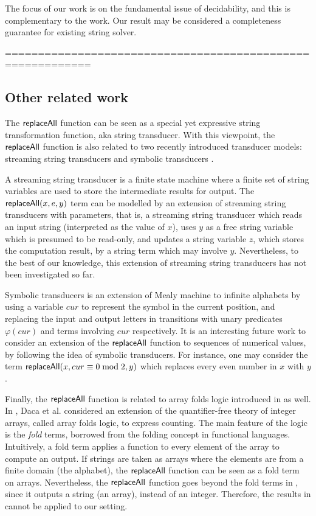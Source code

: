 The focus of our work is on the fundamental issue of decidability, and this is complementary to the work. Our result may be considered a completeness guarantee for existing string solver. 

===========================================================

\subsection*{Other related work}
 
The $\mathsf{replaceAll}$ function can be seen as a special yet expressive string transformation function, aka string transducer. With this viewpoint, 
the $\mathsf{replaceAll}$ function is also related to two recently introduced transducer models: streaming string transducers \cite{AC10} and symbolic transducers \cite{symbolic-transducer}. 

A streaming string transducer is a finite state machine where  a finite set of string variables are used to store the intermediate results for output. The $\mathsf{replaceAll}(x, e, y)$ term can be modelled by an extension of streaming string transducers with parameters, that is, a streaming string transducer which reads an input string (interpreted as the value of $x$), uses $y$ as a free string variable which is presumed to be read-only, and updates a string variable $z$, which stores the computation result, by a string term which may involve $y$. Nevertheless, to the best of our knowledge, this extension of streaming string transducers has not been investigated so far. 

Symbolic transducers is an extension of Mealy machine to infinite alphabets by using a variable $cur$ to represent the symbol in the current position, and replacing the input and output letters in transitions with unary predicates $\varphi(cur)$ and terms involving $cur$ respectively. It is an interesting future work to consider an extension of the $\mathsf{replaceAll}$ function to sequences of numerical values, by following the idea of symbolic transducers. For instance, one may consider the term $\mathsf{replaceAll}(x, cur \equiv 0 \bmod 2, y)$ which replaces every even number in $x$ with $y$.

Finally, the $\mathsf{replaceAll}$ function is related to array folds logic introduced in \cite{DHK16} as well. In \cite{DHK16}, Daca et al. considered an extension of the quantifier-free theory of integer arrays, called array folds logic, to express counting. The main feature of the logic is the \emph{fold} terms, borrowed from the folding concept in functional languages. Intuitively, a fold term applies a function to every element of the array to compute an output. If strings are taken as arrays where the elements are from a finite domain (the alphabet), the $\mathsf{replaceAll}$ function can be seen as a fold term on arrays. Nevertheless, the $\mathsf{replaceAll}$ function goes beyond the fold terms in \cite{DHK16}, since it outputs a string (an array), instead of an integer. Therefore, the results in \cite{DHK16} cannot be applied to our setting.


